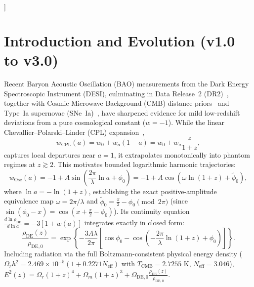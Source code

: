 \documentclass[10pt,twocolumn,a4paper]{article}
\begin{document}
{\begin{@twocolumnfalse}
\begin{abstract}
we publish pre-registered blind 2027 Euclid BAO predictions across $z \in \{1.00, 1.20, 1.40, 1.65\}$.
    \end{abstract}
    \vspace{0.45cm}
  \end{@twocolumnfalse}
}]

\section{Introduction and Evolution (v1.0 to v3.0)}
Recent Baryon Acoustic Oscillation (BAO) measurements from the Dark Energy Spectroscopic Instrument (DESI), culminating in Data Release~2 (DR2)~\cite{desi2025}, together with Cosmic Microwave Background (CMB) distance priors~\cite{chen2019} and Type~Ia supernovae (SNe~Ia)~\cite{brout2022,des2024}, have sharpened evidence for mild low-redshift deviations from a pure cosmological constant ($w = -1$). While the linear Chevallier--Polarski--Linder (CPL) expansion~\cite{chevallier2001,linder2003},
\begin{equation}
w_{\mathrm{CPL}}(a) = w_0 + w_a(1-a) = w_0 + w_a \frac{z}{1+z},
\end{equation}
captures local departures near $a=1$, it extrapolates monotonically into phantom regimes at $z \gtrsim 2$. This motivates bounded logarithmic harmonic trajectories:
\begin{equation}
w_{\mathrm{Osc}}(a) = -1 + A \sin\!\left(\frac{2\pi}{\lambda}\ln a + \phi_0\right) = -1 + A \cos\!\left(\omega\ln(1+z) + \tilde{\phi}_0\right),
\label{eq:w_osc}
\end{equation}
where $\ln a = -\ln(1+z)$, establishing the exact positive-amplitude equivalence map $\omega = 2\pi/\lambda$ and $\tilde{\phi}_0 = \frac{\pi}{2} - \phi_0 \pmod{2\pi}$ (since $\sin(\phi_0 - x) = \cos(x + \frac{\pi}{2} - \phi_0)$). Its continuity equation $\frac{d\ln\rho_{\mathrm{DE}}}{d\ln a} = -3[1 + w(a)]$ integrates exactly in closed form:
\begin{equation}
\frac{\rho_{\mathrm{DE}}(z)}{\rho_{\mathrm{DE},0}} = \exp\!\left\{ -\frac{3 A \lambda}{2\pi} \left[ \cos\phi_0 - \cos\!\left(-\frac{2\pi}{\lambda}\ln(1+z) + \phi_0\right) \right] \right\}.
\label{eq:rho_exact}
\end{equation}
Including radiation via the full Boltzmann-consistent physical energy density ($\Omega_r h^2 = 2.469\times 10^{-5}(1 + 0.2271 N_{\mathrm{eff}})$ with $T_{\mathrm{CMB}} = 2.7255\text{ K}$, $N_{\mathrm{eff}} = 3.046$), $E^2(z) = \Omega_r(1+z)^4 + \Omega_m(1+z)^3 + \Omega_{\mathrm{DE},0}\frac{\rho_{\mathrm{DE}}(z)}{\rho_{\mathrm{DE},0}}$.
\end{document}
